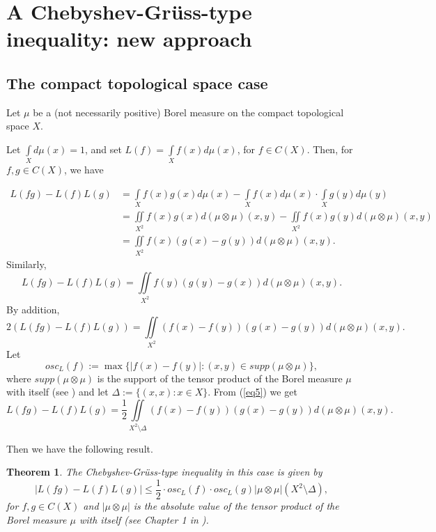 \documentclass[12pt,leqno,a4paper,dvips,twoside]{article}
\newtheorem{thm}{Theorem}[section]
\begin{document}
{\section{A Chebyshev-Gr\"{u}ss-type inequality: new approach}

\subsection{The compact topological space case}
Let $\mu$ be a (not necessarily positive) Borel measure on the compact topological space $X$.

Let $\int\limits_X{d\mu(x)}=1$, and set $L(f)=\int\limits_X{f(x)d\mu(x)}$, for $f\in C(X)$. 
Then, for $f,g\in C(X)$, we have

\begin{align*}
	L(fg)-L(f)L(g)&=\int\limits_X{f(x)g(x)d\mu(x)}-\int\limits_X{f(x)d\mu(x)}\cdot \int\limits_X{g(y)d\mu(y)}\\
	&=\iint\limits_{X^2}{f(x)g(x)d(\mu\otimes\mu)(x,y)}-\iint\limits_{X^2}{f(x)g(y)d(\mu\otimes\mu)(x,y)}\\
	&=\iint\limits_{X^2}{f(x)(g(x)-g(y))d(\mu\otimes\mu)(x,y)}.
\end{align*}
Similarly, 
	\begin{equation*}
		L(fg)-L(f) L(g)=\iint\limits_{X^2}{f(y)(g(y)-g(x))d(\mu\otimes\mu)(x,y)}.
	\end{equation*}
By addition,
	\begin{equation}\label{eq5}
		2(L(fg)-L(f) L(g))=\iint\limits_{X^2}{(f(x)-f(y))(g(x)-g(y))d(\mu\otimes\mu)(x,y)}.
	\end{equation}
Let 
	\begin{equation*}
		osc_L(f):=\max\{\left|f(x)-f(y)\right|: (x,y)\in supp (\mu\otimes\mu)\},
	\end{equation*}
where $supp (\mu\otimes\mu)$ is the support of the tensor product of the Borel measure $\mu$ with itself (see \cite{altomare:1994}) and let $\Delta:=\{(x,x):x\in X\}$. From (\ref{eq5}) we get
	\begin{equation*}
		L(f g)-L(f) L(g)=\frac{1}{2}\iint\limits_{X^2\setminus\Delta}{(f(x)-f(y))(g(x)-g(y))d(\mu\otimes\mu)(x,y)}.
	\end{equation*}

Then we have the following result. 

\begin{thm}
	The Chebyshev-Gr\"{u}ss-type inequality in this case is given by
	\begin{equation*}
		\left| L(fg)-L(f) L(g)\right|\leq \frac{1}{2}\cdot osc_L(f)\cdot osc_L(g)\left|\mu\otimes\mu\right|(X^2\setminus \Delta),
	\end{equation*}
	for $f, g\in C(X)$ and $\left|\mu\otimes\mu\right|$ is the absolute value of the tensor product of the Borel measure $\mu$ with itself (see Chapter 1 in \cite{altomare:1994}).
\end{thm}

}
\end{document}
